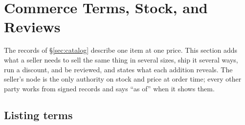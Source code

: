 \section{Commerce Terms, Stock, and Reviews}
\label{sec:commerce}

The records of \S\ref{sec:catalog} describe one item at one price. This section adds what a seller needs to sell the same thing in several sizes, ship it several ways, run a discount, and be reviewed, and states what each addition reveals. The seller's node is the only authority on stock and price at order time; every other party works from signed records and says ``as of'' when it shows them.

\subsection{Listing terms}

